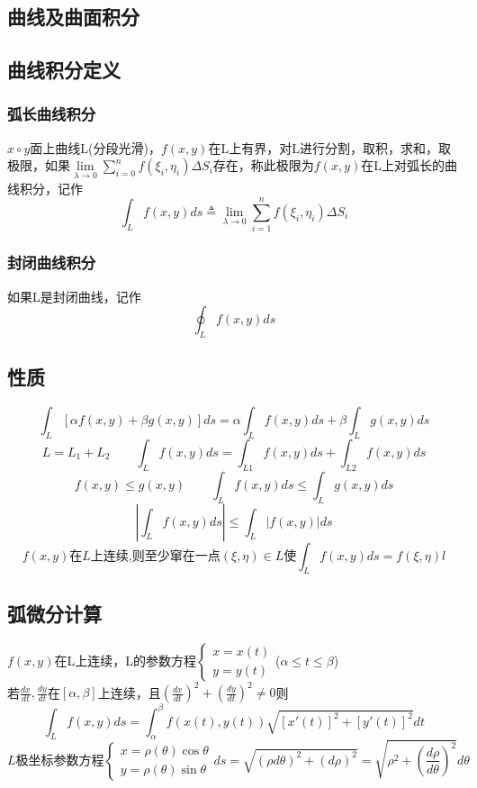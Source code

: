 \begin{center}\section{曲线及曲面积分}\label{chapter_curvilinear_integral}\end{center}
\subsection{曲线积分定义}
\subsubsection{弧长曲线积分}
$x\circ y$面上曲线L(分段光滑)，$f(x,y)$在L上有界，对L进行分割，取积，求和，取极限，如果$\lim\limits_{\lambda\to 0}\sum\limits_{i=0}^{n}f(\xi_i,\eta_i)\Delta S_i$存在，称此极限为$f(x,y)$在L上对弧长的曲线积分，记作
$$\int_{L}f(x,y)ds\triangleq \lim\limits_{\lambda\to 0}\sum\limits_{i=1}^{n}f(\xi_i,\eta_i)\Delta S_i$$
\subsubsection{封闭曲线积分}
如果L是封闭曲线，记作\\
$$\oint_Lf(x,y)ds$$
\subsection{性质}
$$\int_L[\alpha f(x,y)+\beta g(x,y)]ds=\alpha\int_L f(x,y)ds+\beta\int_L g(x,y)ds$$
$$L=L_1+L_2\qquad \int_L f(x,y)ds=\int_{L1} f(x,y)ds+\int_{L2} f(x,y)ds$$
$$f(x,y)\leqslant g(x,y)\qquad \int_L f(x,y)ds\leqslant \int_L g(x,y)ds$$
$$\left|\int_L f(x,y)ds\right|\leqslant \int_L|f(x,y)|ds$$
$$f(x,y)\mbox{在}L\mbox{上连续,则至少窜在一点}(\xi,\eta)\in L\mbox{使}\int_L f(x,y)ds=f(\xi,\eta)l$$
\subsection{弧微分计算}
$f(x,y)$在L上连续，L的参数方程$\begin{cases}
	x=x(t)\\
	y=y(t)
\end{cases}$\quad ($\alpha\leqslant t\leqslant \beta$)\\
若$\frac{dx}{dt},\frac{dy}{dt}$在$[\alpha,\beta]$上连续，且$\left(\frac{dx}{dt}\right)^2+\left(\frac{dy}{dt}\right)^2\neq 0$则\\
$$\int_{L}f(x,y)ds=\int_{\alpha}^{\beta}f(x(t),y(t))\sqrt{[x'(t)]^2+[y'(t)]^2}dt$$
$$L\mbox{极坐标参数方程}\begin{cases}
	x=\rho(\theta)\cos\theta\\
	y=\rho(\theta)\sin\theta
\end{cases}
ds=\sqrt{(\rho d\theta)^2+(d\rho)^2}=\sqrt{\rho^2+\left(\frac{d\rho}{d\theta}\right)^2}d\theta$$
